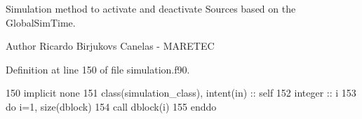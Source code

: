Simulation method to activate and deactivate Sources based on the GlobalSim\+Time. 

\begin{DoxyAuthor}{Author}
Ricardo Birjukovs Canelas -\/ M\+A\+R\+E\+T\+EC 
\end{DoxyAuthor}


Definition at line 150 of file simulation.\+f90.


\begin{DoxyCode}
150         \textcolor{keywordtype}{implicit none}
151         \textcolor{keywordtype}{class}(simulation\_class), \textcolor{keywordtype}{intent(in)} :: self
152         \textcolor{keywordtype}{integer} :: i
153         \textcolor{keywordflow}{do} i=1, \textcolor{keyword}{size}(dblock)
154             \textcolor{keyword}{call }dblock(i)%
155 \textcolor{keywordflow}{        enddo}        
\end{DoxyCode}
